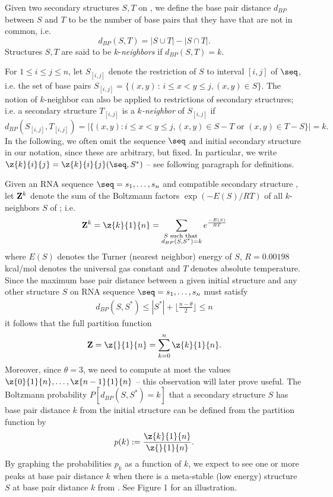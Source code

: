Given two secondary structures $S,T$ on \seq, we
define the base pair distance $d_{BP}$ between $S$ and $T$
to be the number of base pairs that they have that are not in
common, i.e.
\begin{equation}
d_{BP}(S,T) = |S \cup T| - |S \cap T|.
\end{equation}
Structures $S,T$ are said to be $k$-{\em neighbors} if $d_{BP}(S,T) = k$.


For $1\leq i \leq j \leq n$, let
$S_{[i,j]}$ denote the restriction of $S$ to interval
$[i,j]$ of $\seq$, i.e. the set of base pairs
%
$S_{[i,j]} = \{ (x,y) \,:\, i \leq  x < y \leq j,  (x,y) \in S \}$.
%
The notion of $k$-neighbor can also be applied to restrictions of secondary
structures; i.e. a secondary structure $T_{[i,j]}$ is a
{\em $k$-neighbor} of $S_{[i,j]}$ if
\[
d_{BP}(S_{[i,j]},T_{[i,j]})= |\{ (x,y): i \leq x<y\leq j,
(x,y) \in S-T \mbox{ or } (x,y) \in T-S \}| = k.
\]
In the following,
we often omit the sequence $\seq$ and initial secondary structure \strSt in our
notation, since these are arbitrary, but fixed.
In particular, we write $\z{k}{i}{j} = \z{k}{i}{j}(\seq,S^*)$ --
see following paragraph for definitions.


Given an RNA sequence $\seq=s_1,\ldots,s_n$ and compatible secondary structure
\strSt, let ${\bf Z}^k$ denote the sum
of the Boltzmann factors $\exp(-E(S)/RT)$ of all $k$-neighbors $S$ of  \strSt;
i.e.
\[
{\bf Z}^k = \z{k}{1}{n} =
\sum_{\substack{S \text{ such that }\\ d_{BP}(S,S^*)=k}}
e^{\frac{-E(S)}{RT}}
\]
where $E(S)$ denotes the Turner (nearest neighbor)
energy \cite{turner,xia:RNA}
of $S$, $R = 0.00198$ kcal/mol denotes the universal
gas constant and $T$ denotes absolute temperature.
Since the maximum base pair distance between a given initial
structure \strSt and any other structure $S$ on RNA sequence
$\seq = s_1,\ldots,s_n$ must satisfy
\begin{eqnarray}
\label{eq:upperBound}
d_{BP}(S,S^*) \leq |S^*| + \lfloor \frac{n-\theta}{2} \rfloor \leq n
\end{eqnarray}
it follows that the full partition function
\begin{eqnarray}
\label{eq:mcCaskillPartitionFun}
{\bf Z}=\z{}{1}{n} = \sum_{k=0}^n \z{k}{1}{n}.
\end{eqnarray}
Moreover, since $\theta=3$,
we need to compute at most the values
$\z{0}{1}{n},\ldots,\z{n-1}{1}{n}$ -- this observation will later prove useful.
The Boltzmann probability
$P[d_{BP}(S,S^*) = k]$
that a secondary structure $S$ has base pair distance $k$ from the initial
structure \strSt can be defined from the partition function by
\[
p(k) :=\frac{\z{k}{1}{n}}{\z{}{1}{n}}.
\]
By graphing the probabilities $p_k$ as a function of $k$,
we expect to see one or more peaks at base pair distance $k$ when
there is a meta-stable (low energy) structure $S$
at base pair distance $k$ from \strSt.
See Figure 1 for an illustration.

